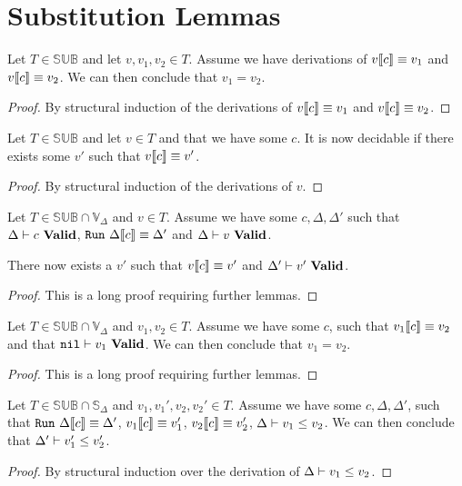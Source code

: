 \section{Substitution Lemmas}

\begin{lemma}
  Let $T \in \mathbb{SUB}$ and let $v, v_1, v_2 \in T$. Assume we have
  derivations of ${v} \llbracket {c} \rrbracket \equiv {v_1}$ and ${v} \llbracket {c} \rrbracket \equiv {v_2}$. We
  can then conclude that $v_1 = v_2$.
\end{lemma}
\begin{proof}
  By structural induction of the derivations of ${v} \llbracket {c} \rrbracket \equiv {v_1}$ and
  ${v} \llbracket {c} \rrbracket \equiv {v_2}$.
\end{proof}

\begin{lemma}
  Let $T \in \mathbb{SUB}$ and let $v \in T$ and that we have some $c$.  It is
  now decidable if there exists some $v'$ such that ${v} \llbracket {c} \rrbracket \equiv {v'}$.
\end{lemma}
\label{dec:substitution}
\begin{proof}
  By structural induction of the derivations of $v$.
\end{proof}

\begin{lemma}
  Let $T \in \mathbb{SUB} \cap \mathbb{V}_\Delta$ and $v \in T$. Assume we have
  some $c, \Delta, \Delta'$ such that ${\Delta} |- {c}\ \mathbf{Valid}$,
  $\mathtt{Run}\ {\Delta} \llbracket {c} \rrbracket \equiv {\Delta'}$ and ${\Delta} |- {v}\ \mathbf{Valid}$.

  There now exists a $v'$ such that ${v} \llbracket {c} \rrbracket \equiv {v'}$ and
  ${\Delta'} |- {v'}\ \mathbf{Valid}$.
\end{lemma}

\begin{proof}
  This is a long proof requiring further lemmas.
\end{proof}

\begin{lemma}
  Let $T \in \mathbb{SUB} \cap \mathbb{V}_\Delta$ and $v_1, v_2 \in T$. Assume
  we have some $c$, such that ${v_1} \llbracket {c} \rrbracket \equiv {v_2}$ and that
  ${\mathtt{nil}} |- {v_1}\ \mathbf{Valid}$. We can then conclude that $v_1 = v_2$.
\end{lemma}

\begin{proof}
  This is a long proof requiring further lemmas.
\end{proof}

\begin{lemma}
  Let $T \in \mathbb{SUB} \cap \mathbb{S}_\Delta$ and
  $v_1, v_1', v_2, v_2' \in T$. Assume we have some $c, \Delta, \Delta'$, such
  that $\mathtt{Run}\ {\Delta} \llbracket {c} \rrbracket \equiv {\Delta'}$, ${v_1} \llbracket {c} \rrbracket \equiv {v_1'}$,
  ${v_2} \llbracket {c} \rrbracket \equiv {v_2'}$, ${\Delta} |- {v_1} \le {v_2}$. We can then
  conclude that ${\Delta'} |- {v_1'} \le {v_2'}$.
\end{lemma}

\begin{proof}
  By structural induction over the derivation of ${\Delta} |- {v_1} \le {v_2}$.
\end{proof}
